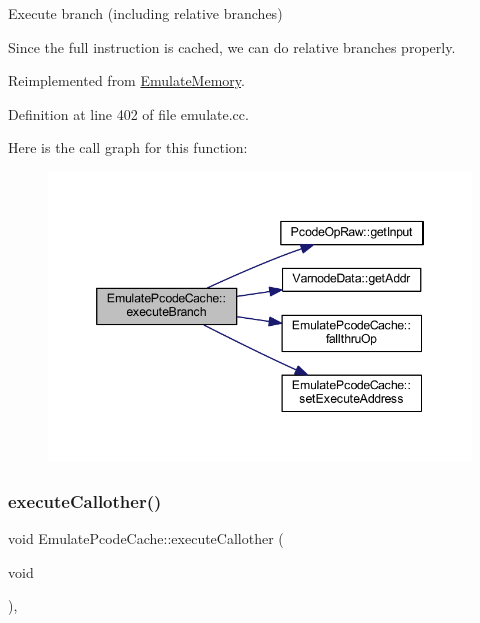 Execute branch (including relative branches) 

Since the full instruction is cached, we can do relative branches properly. 

Reimplemented from \mbox{\hyperlink{class_emulate_memory_ac69d1f93ffc1a86d3486af34bb520302}{Emulate\+Memory}}.



Definition at line 402 of file emulate.\+cc.

Here is the call graph for this function\+:
\nopagebreak
\begin{figure}[H]
\begin{center}
\leavevmode
\includegraphics[width=346pt]{class_emulate_pcode_cache_a6108efef1c0291ca887228781e4c1238_cgraph}
\end{center}
\end{figure}
\mbox{\label{class_emulate_pcode_cache_a5f90b72957b644a794455f051cb3ad2d}} 
\subsubsection{\texorpdfstring{executeCallother()}{executeCallother()}}
{\footnotesize\ttfamily void Emulate\+Pcode\+Cache\+::execute\+Callother (\begin{DoxyParamCaption}\item[{void}]{ }\end{DoxyParamCaption})\hspace{0.3cm}{\ttfamily [protected]}, {\ttfamily [virtual]}}



